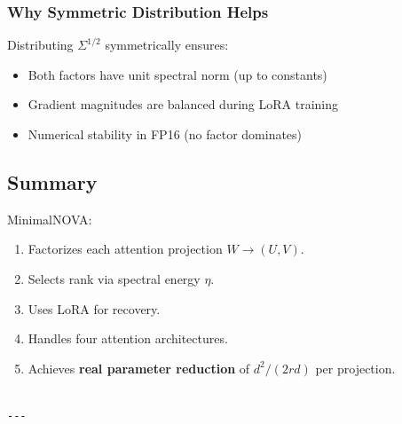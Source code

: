 \subsubsection{Why Symmetric Distribution Helps}

Distributing $\Sigma^{1/2}$ symmetrically ensures:
\begin{itemize}
\item Both factors have unit spectral norm (up to constants)
\item Gradient magnitudes are balanced during LoRA training
\item Numerical stability in FP16 (no factor dominates)

\end{itemize}
\subsection{Summary}

MinimalNOVA:
\begin{enumerate}
\item Factorizes each attention projection $W \to (U, V)$.
\item Selects rank via spectral energy $\eta$.
\item Uses LoRA for recovery.
\item Handles four attention architectures.
\item Achieves \textbf{real parameter reduction} of $d^2 / (2rd)$ per projection.
\end{enumerate}
\begin{lstlisting}

---
\end{lstlisting}